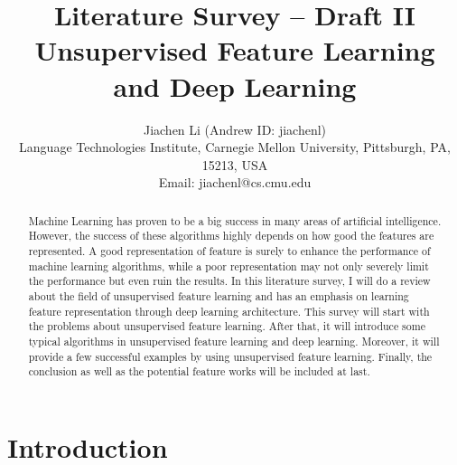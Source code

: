 \documentclass[conference]{IEEEtran}
\begin{document}
\title{Literature Survey -- Draft II \\ Unsupervised Feature Learning and Deep Learning}
\author{Jiachen Li (Andrew ID: jiachenl)\\%
Language Technologies Institute, Carnegie Mellon University, Pittsburgh, PA, 15213, USA\\
Email: jiachenl@cs.cmu.edu
}





\maketitle %




\begin{abstract}
Machine Learning has proven to be a big success in many areas of artificial intelligence. However, the success of these algorithms highly depends on how good the features are represented. A good representation of feature is surely
to enhance the performance of machine learning algorithms, while a poor representation may not only severely limit the performance
but even ruin the results. In this literature survey, I will do a review about the field of unsupervised feature learning and has an emphasis on learning feature representation through deep learning architecture. This survey will start with the problems about unsupervised feature learning. After that, it will introduce some typical algorithms in unsupervised feature learning and deep learning. Moreover, it will provide a few successful examples by using unsupervised feature learning. Finally, the conclusion as well as the potential feature works will be included at last.

\end{abstract}

\section{Introduction}
\end{document}
